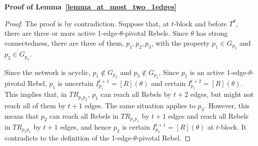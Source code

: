 \documentclass[12pt,letter]{article}
\newtheorem*{lemma*}{Lemma}
\theoremstyle{definition}
\theoremstyle{remark}
\theoremstyle{claim}
\begin{document}
\noindent\textbf{Proof of Lemma~\ref{lemma_at_most_two_1edges}} 
   
\begin{proof}
The proof is by contradiction. Suppose that, at $t$-block and before $T^{\theta}$, there are three or more active 1-edge-$\theta$-pivotal Rebels. Since $\theta$ has strong connectedness, there are three of them, $p_1,p_2,p_3$, with the property $p_1\in G_{p_2}$ and $p_2 \in G_{p_3}$. 

Since the network is acyclic, $p_1\notin G_{p_3}$ and $p_3\notin G_{p_1}$. Since $p_1$ is an active 1-edge-$\theta$-pivotal Rebel, $p_1$ is uncertain  $I^{t+1}_{p_1}= [R](\theta)$ and certain $I^{t+2}_{p_1}=[R](\theta)$. This implies that, in $TR_{p_1p_2}$, $p_1$ can reach all Rebels by $t+2$ edges, but might not reach all of them by $t+1$ edges. The same situation applies to $p_3$. However, this means that $p_2$ can reach all Rebels in $TR_{p_1p_1}$ by $t+1$ edges and reach all Rebels in $TR_{p_1p_1}$ by $t+1$ edges, and hence $p_2$ is certain $I^{t+1}_{p_2}=[R](\theta)$ at $t$-block. It contradicts to the definition of the 1-edge-$\theta$-pivotal Rebel.

\end{proof}
\bigskip
\end{document}
